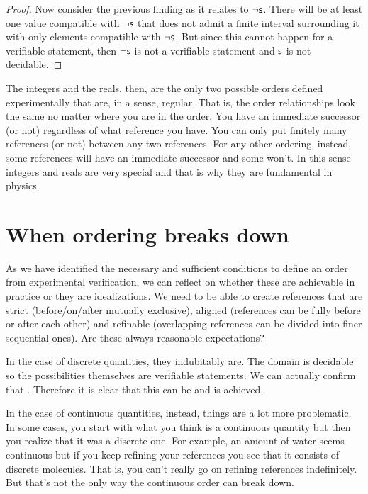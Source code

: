 \begin{mathSection}
\begin{proof}
		Now consider the previous finding as it relates to $\neg \mathsf{s}$. There will be at least one value compatible with $\neg \mathsf{s}$ that does not admit a finite interval surrounding it with only elements compatible with $\neg \mathsf{s}$. But since this cannot happen for a verifiable statement, then $\neg \mathsf{s}$ is not a verifiable statement and $\mathsf{s}$ is not decidable.
	\end{proof}
\end{mathSection}

The integers and the reals, then, are the only two possible orders defined experimentally that are, in a sense, regular. That is, the order relationships look the same no matter where you are in the order. You have an immediate successor (or not) regardless of what reference you have. You can only put finitely many references (or not) between any two references. For any other ordering, instead, some references will have an immediate successor and some won't. In this sense integers and reals are very special and that is why they are fundamental in physics.

\section{When ordering breaks down}

As we have identified the necessary and sufficient conditions to define an order from experimental verification, we can reflect on whether these are achievable in practice or they are idealizations. We need to be able to create references that are strict (before/on/after mutually exclusive), aligned (references can be fully before or after each other) and refinable (overlapping references can be divided into finer sequential ones). Are these always reasonable expectations?

In the case of discrete quantities, they indubitably are. The domain is decidable so the possibilities themselves are verifiable statements. We can actually confirm that . Therefore it is clear that this can be and is achieved.

In the case of continuous quantities, instead, things are a lot more problematic. In some cases, you start with what you think is a continuous quantity but then you realize that it was a discrete one. For example, an amount of water seems continuous but if you keep refining your references you see that it consists of discrete molecules. That is, you can't really go on refining references indefinitely. But that's not the only way the continuous order can break down.

